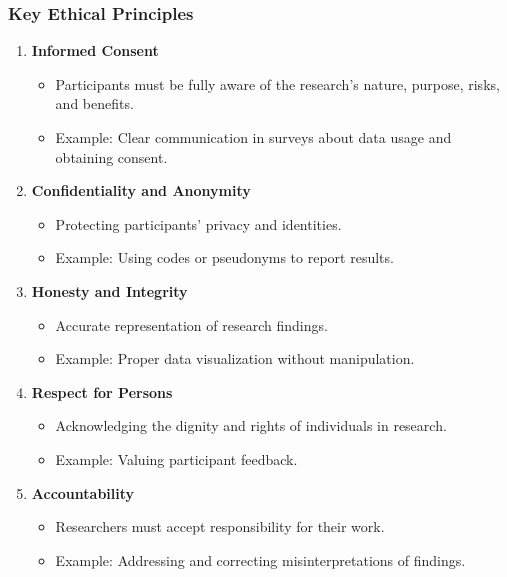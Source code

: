 \documentclass[aspectratio=169]{beamer}
\begin{document}
\begin{frame}[fragile]
    \frametitle{Key Ethical Principles}
    \begin{enumerate}
        \item \textbf{Informed Consent}
        \begin{itemize}
            \item Participants must be fully aware of the research's nature, purpose, risks, and benefits.
            \item Example: Clear communication in surveys about data usage and obtaining consent.
        \end{itemize}

        \item \textbf{Confidentiality and Anonymity}
        \begin{itemize}
            \item Protecting participants' privacy and identities.
            \item Example: Using codes or pseudonyms to report results.
        \end{itemize}

        \item \textbf{Honesty and Integrity}
        \begin{itemize}
            \item Accurate representation of research findings.
            \item Example: Proper data visualization without manipulation.
        \end{itemize}

        \item \textbf{Respect for Persons}
        \begin{itemize}
            \item Acknowledging the dignity and rights of individuals in research.
            \item Example: Valuing participant feedback.
        \end{itemize}

        \item \textbf{Accountability}
        \begin{itemize}
            \item Researchers must accept responsibility for their work.
            \item Example: Addressing and correcting misinterpretations of findings.
        \end{itemize}
    \end{enumerate}
\end{frame}
\end{document}
